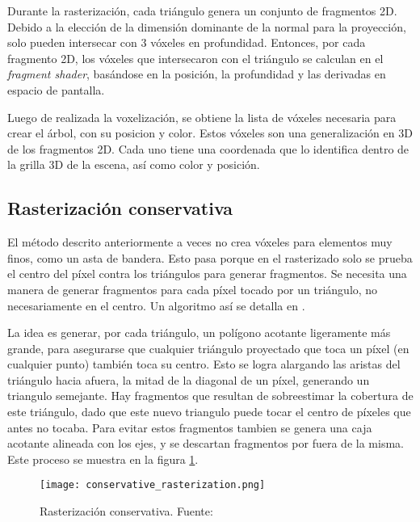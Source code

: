 Durante la rasterización, cada triángulo genera un conjunto de fragmentos 2D.
Debido a la elección de la dimensión dominante de la normal para la proyección, solo pueden intersecar con 3 vóxeles en profundidad. %
Entonces, por cada fragmento 2D, los vóxeles que intersecaron con el triángulo se calculan en el \textit{fragment shader}, basándose en la posición, la profundidad y las derivadas en espacio de pantalla. %

Luego de realizada la voxelización, se obtiene la lista de vóxeles necesaria para crear el árbol, con su posicion y color.
Estos vóxeles son una generalización en 3D de los fragmentos 2D.
Cada uno tiene una coordenada que lo identifica dentro de la grilla 3D de la escena, así como color y posición.

\subsection{Rasterización conservativa}

El método descrito anteriormente a veces no crea vóxeles para elementos muy finos, como un asta de bandera.
Esto pasa porque en el rasterizado solo se prueba el centro del píxel contra los triángulos para generar fragmentos. %
Se necesita una manera de generar fragmentos para cada píxel tocado por un triángulo, no necesariamente en el centro.
Un algoritmo así se detalla en \cite{conservative-rasterization}.

La idea es generar, por cada triángulo, un polígono acotante ligeramente más grande, para asegurarse que cualquier triángulo proyectado que toca un píxel (en cualquier punto) también toca su centro.
Esto se logra alargando las aristas del triángulo hacia afuera, la mitad de la diagonal de un píxel, generando un triangulo semejante.
Hay fragmentos que resultan de sobreestimar la cobertura de este triángulo, dado que este nuevo triangulo puede tocar el centro de píxeles que antes no tocaba.
Para evitar estos fragmentos tambien se genera una caja acotante alineada con los ejes, y se descartan fragmentos por fuera de la misma.
Este proceso se muestra en la figura \ref{fig:conservative_rasterization}.

\begin{figure}[h!]
    \centering
    \texttt{[image: conservative\_rasterization.png]}
    \caption{Rasterización conservativa. Fuente: \cite{opengl-insights}}
    \label{fig:conservative_rasterization}
\end{figure}

